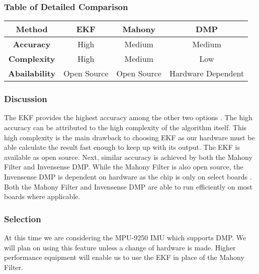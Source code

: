 \subsubsection{Table of Detailed Comparison}
\hfill \break
\begin{center}
\begin{tabular}{|c|c|c|c|}
\hline
\textbf{Method}       & \textbf{EKF} & \textbf{Mahony} & \textbf{DMP} 		\\ \hline
\textbf{Accuracy}     & High  		 & Medium          & Medium 			\\ \hline
\textbf{Complexity}   & High  		 & Medium          & Low				\\ \hline
\textbf{Abailability} & Open Source  & Open Source     & Hardware Dependent	\\ \hline
\end{tabular}
\end{center}

\hfill \break
\subsubsection{Discussion}
The EKF provides the highest accuracy among the other two options \cite{EFK_MAHONY}.
The high accuracy can be attributed to the high complexity of the algorithm itself.
This high complexity is the main drawback to choosing EKF as our hardware must be able calculate the result fast enough to keep up with its output.
The EKF is available as open source. Next, similar accuracy is achieved by both the Mahony Filter and Invensense DMP.
While the Mahony Filter is also open source, the Invensense DMP is dependent on hardware as the chip is only on select boards \cite{MPU9250SDK}.
Both the Mahony Filter and Invensense DMP are able to run efficiently on most boards where applicable. \\

\subsubsection{Selection}
At this time we are considering the MPU-9250 IMU which supports DMP.
We will plan on using this feature unless a change of hardware is made.
Higher performance equipment will enable us to use the EKF in place of the Mahony Filter. \\
